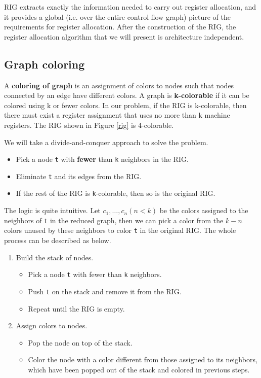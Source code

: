 RIG extracts exactly the information needed to carry out register allocation, and it provides a global (i.e. over the entire control flow graph) picture of the requirements for register allocation. After the construction of the RIG, the register allocation algorithm that we will present is architecture independent.
\subsection{Graph coloring}
A \textbf{coloring of graph} is an assignment of colors to nodes such that nodes connected by an edge have different colors. A graph is \textbf{k-colorable} if it can be colored using k or fewer colors. In our problem, if the RIG is k-colorable, then there must exist a register assignment that uses no more than k machine registers. The RIG shown in Figure \ref{rig} is 4-colorable.

We will take a divide-and-conquer approach to solve the problem.
\begin{itemize}
\item Pick a node \texttt{t} with \textbf{fewer} than \texttt{k} neighbors in the RIG.
\item Eliminate \texttt{t} and its edges from the RIG.
\item If the rest of the RIG is \texttt{k}-colorable, then so is the original RIG.
\end{itemize}
The logic is quite intuitive. Let $c_1,\dots,c_n(n<k)$ be the colors assigned to the neighbors of \texttt{t} in the reduced graph, then we can pick a color from the $k-n$ colors unused by these neighbors to color \texttt{t} in the original RIG. The whole process can be described as below.
\begin{enumerate}
\item Build the stack of nodes.
\begin{itemize}
\item Pick a node \texttt{t} with fewer than \texttt{k} neighbors.
\item Push \texttt{t} on the stack and remove it from the RIG.
\item Repeat until the RIG is empty.
\end{itemize}
\item Assign colors to nodes.
\begin{itemize}
\item Pop the node on top of the stack.
\item Color the node with a color different from those assigned to its neighbors, which have been popped out of the stack and colored in previous steps.
\end{itemize}
\end{enumerate}
